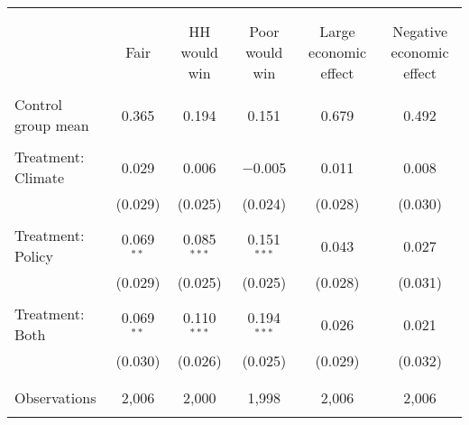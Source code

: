 
\begin{tabular}{@{\extracolsep{5pt}}lccccc} 
\\[-1.8ex]\hline 
\hline \\[-1.8ex] 
\\[-1.8ex] & Fair & HH would win & Poor would win & Large economic effect & Negative economic effect \\ 
\hline \\[-1.8ex] 
 Control group mean & 0.365 & 0.194 & 0.151 & 0.679 & 0.492  \\ \hline \\[-1.8ex] Treatment: Climate & 0.029 & 0.006 & $-$0.005 & 0.011 & 0.008 \\ 
  & (0.029) & (0.025) & (0.024) & (0.028) & (0.030) \\ 
  & & & & & \\ 
 Treatment: Policy & 0.069$^{**}$ & 0.085$^{***}$ & 0.151$^{***}$ & 0.043 & 0.027 \\ 
  & (0.029) & (0.025) & (0.025) & (0.028) & (0.031) \\ 
  & & & & & \\ 
 Treatment: Both & 0.069$^{**}$ & 0.110$^{***}$ & 0.194$^{***}$ & 0.026 & 0.021 \\ 
  & (0.030) & (0.026) & (0.025) & (0.029) & (0.032) \\ 
  & & & & & \\ 
\hline \\[-1.8ex] 

Observations & 2,006 & 2,000 & 1,998 & 2,006 & 2,006 \\ 
\hline 
\hline \\[-1.8ex] 
\end{tabular} 
